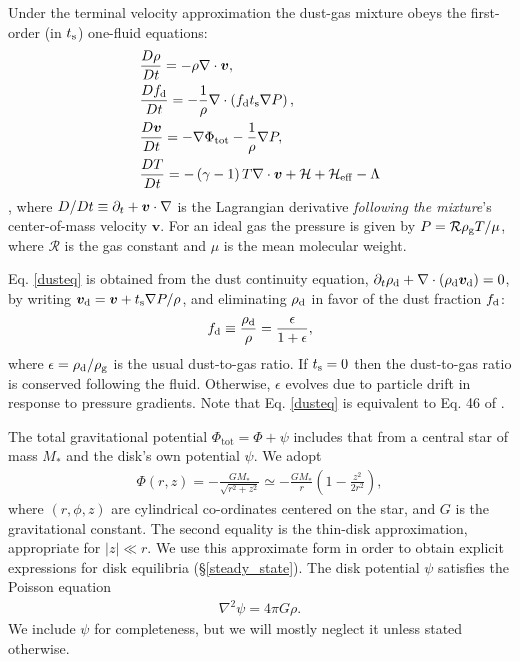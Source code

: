 
Under the terminal velocity approximation the dust-gas mixture obeys   
the first-order (in $t_\mathrm{s}$) one-fluid equations: 
\begin{align} 
  &\frac{D\rho}{Dt} = -\rho\nabla\cdot\bm{v}, \label{masseq}\\ 
   &\frac{Df_\mathrm{d}}{Dt} = -\frac{1}{\rho} \nabla \cdot \left(f_\mathrm{d} 
     t_\mathrm{s} \nabla P \right),\label{dusteq}\\
  &\frac{D\bm{v}}{Dt} = - \nabla\Phi_\mathrm{tot} - \frac{1}{\rho}\nabla  P, \label{momeq}\\ 
  &\frac{D T}{D t} = - \left(\gamma-1\right)T\nabla\cdot\bm{v} +
  \mathcal{H} + \mathcal{H}_\mathrm{eff}  - \Lambda  \label{tempeq} 
\end{align} 
\citep[see ][for a detailed derivation from the two-fluid
equations]{laibe14,price15}, where $D/Dt \equiv \partial_t +
\bm{v}\cdot\nabla$ is the Lagrangian 
derivative \emph{following the mixture}'s center-of-mass velocity $\bm{v}$. 
For an ideal gas the pressure is given 
by $P = \mathcal{R}\rho_\mathrm{g} T/\mu $, where $\mathcal{R}$ is
the gas constant and $\mu$ is the mean molecular weight. 



Eq. \ref{dusteq} is obtained from the dust continuity equation,  
$\partial_t\rho_\mathrm{d} + \nabla\cdot\left(\rho_\mathrm{d}\bm{v}_\mathrm{d}\right)= 0$, 
by writing 
$\bm{v}_\mathrm{d}=\bm{v} + t_\mathrm{s}\nabla P/\rho$, and eliminating  
$\rho_\mathrm{d}$ in favor of the dust fraction $f_\mathrm{d}$: 
\begin{align}
  f_\mathrm{d} \equiv \frac{\rho_\mathrm{d}}{\rho}  = \frac{\epsilon}{1+\epsilon},
\end{align}
where $\epsilon=\rho_\mathrm{d}/\rho_\mathrm{g}$ is the usual
dust-to-gas ratio. 
If $t_\mathrm{s}=0$ then the 
dust-to-gas ratio is conserved following the fluid. Otherwise, 
$\epsilon$ evolves due to particle drift in response to pressure
gradients. Note that Eq. \ref{dusteq} is equivalent to Eq. 46 of 
\cite{jacquet11}. 



The total gravitational potential $\Phi_\mathrm{tot}=\Phi +
\psi$ includes that from a central star of mass $M_*$ and the disk's own
potential $\psi$. We adopt 
\begin{align}\label{thin_disk_potential}
  \Phi(r,z) =-\frac{GM_*}{\sqrt{r^2 + z^2}}\simeq
  -\frac{GM_*}{r}\left(1 - \frac{z^2}{2r^2}\right),  
\end{align}
where $(r,\phi, z)$ are cylindrical co-ordinates centered on the star, and 
$G$ is the gravitational constant. The second equality is the  
thin-disk approximation, appropriate for
$|z|\ll r$. We use this approximate form in order to
obtain explicit expressions for disk equilibria (\S\ref{steady_state}). 
The disk potential $\psi$ satisfies the Poisson equation
\begin{align}
  \nabla^2\psi = 4 \pi G \rho.\label{poisson}
\end{align}
We include $\psi$ for
completeness, but we will mostly neglect it unless stated
otherwise.  


